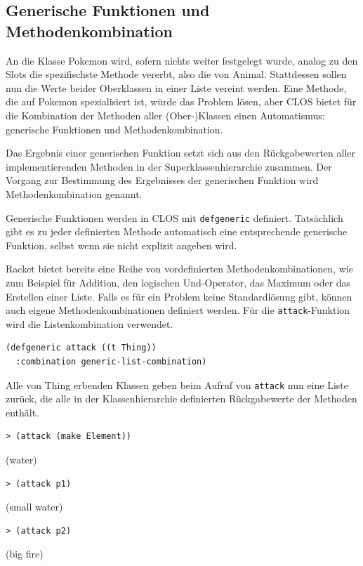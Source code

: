 \subsection{Generische Funktionen und Methodenkombination}
An die Klasse Pokemon wird, sofern nichts weiter festgelegt wurde, analog zu den Slots die spezifischste Methode vererbt, also die von Animal. Stattdessen sollen nun die Werte beider Oberklassen in einer Liste vereint werden. Eine Methode, die auf Pokemon spezialisiert ist, würde das Problem lösen, aber CLOS bietet für die Kombination der Methoden aller (Ober-)Klassen einen Automatismus: generische Funktionen und Methodenkombination. 
 
Das Ergebnis einer generischen Funktion setzt sich aus den Rückgabewerten aller implementierenden Methoden in der Superklassenhierarchie zusammen. Der Vorgang zur Bestimmung des Ergebnisses der generischen Funktion wird Methodenkombination genannt.

Generische Funktionen werden in CLOS mit \texttt{defgeneric} definiert. Tatsächlich gibt es zu jeder definierten Methode automatisch eine entsprechende generische Funktion, selbst wenn sie nicht explizit angeben wird. 

Racket bietet bereits eine Reihe von vordefinierten Methodenkombinationen, wie zum Beispiel für Addition, den logischen Und-Operator, das Maximum oder das Erstellen einer Liste. Falls es für ein Problem keine Standardlösung gibt, können auch eigene Methodenkombinationen definiert werden. Für die \texttt{attack}-Funktion wird die Listenkombination verwendet.

\begin{lstlisting}
(defgeneric attack ((t Thing))
  :combination generic-list-combination)
\end{lstlisting}

Alle von Thing erbenden Klassen geben beim Aufruf von \texttt{attack} nun eine Liste zurück, die alle in der Klassenhierarchie definierten Rückgabewerte der Methoden enthält.

\begin{lstlisting}
> (attack (make Element))
\end{lstlisting}
{\rsymbol (water)}

\begin{lstlisting}
> (attack p1)
\end{lstlisting}
{\rsymbol (small water)}

\begin{lstlisting}
> (attack p2)
\end{lstlisting}
{\rsymbol (big fire)}

